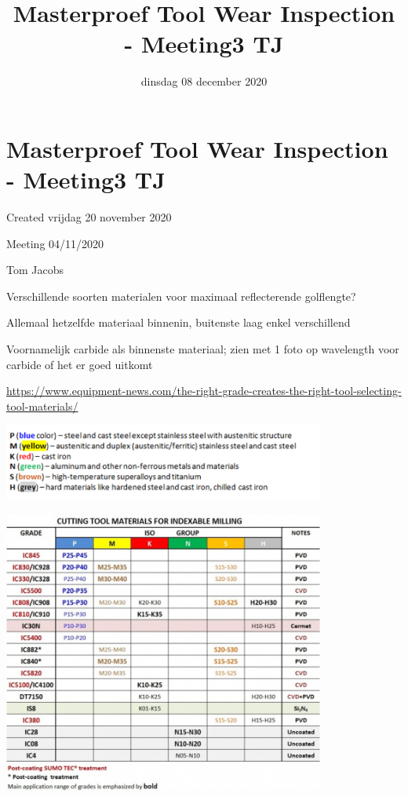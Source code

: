 \documentclass{scrartcl}
\title{Masterproef Tool Wear Inspection - Meeting3 TJ}
\date{dinsdag 08 december 2020}
\author{}
\begin{document}
\maketitle

		\section{Masterproef Tool Wear Inspection - Meeting3 TJ}

Created vrijdag 20 november 2020



Meeting 04/11/2020



Tom Jacobs



Verschillende soorten materialen voor maximaal reflecterende golflengte?

	Allemaal hetzelfde materiaal binnenin, buitenste laag enkel verschillend
	
	Voornamelijk carbide als binnenste materiaal; zien met 1 foto op wavelength voor carbide of het er goed uitkomt
	
	\href{https://www.equipment-news.com/the-right-grade-creates-the-right-tool-selecting-tool-materials/}{https://www.equipment-news.com/the-right-grade-creates-the-right-tool-selecting-tool-materials/}
	
	

	 \includegraphics[width=4.166667in, keepaspectratio=true]{./Masterproef_Tool_Wear_Inspection_-_Meeting3_TJ/Types_sterkte_plaatjes.png}
	
\includegraphics[width=4.166667in, keepaspectratio=true]{./Masterproef_Tool_Wear_Inspection_-_Meeting3_TJ/plaatjes_nummers.png}
\end{document}
